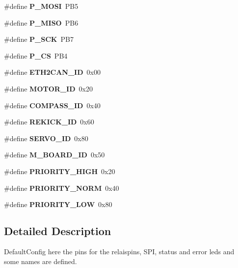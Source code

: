 \begin{DoxyCompactItemize}
\item 
\#define {\bfseries \-P\-\_\-\-M\-O\-S\-I}~\-P\-B5\label{defaults_8h_a6023494e194ef83733de87fc5b704c01}

\item 
\#define {\bfseries \-P\-\_\-\-M\-I\-S\-O}~\-P\-B6\label{defaults_8h_a8644e32e9fe3b629a67a3475191e4731}

\item 
\#define {\bfseries \-P\-\_\-\-S\-C\-K}~\-P\-B7\label{defaults_8h_adbb2b26d54c39d1abbfd329a341aeecf}

\item 
\#define {\bfseries \-P\-\_\-\-C\-S}~\-P\-B4\label{defaults_8h_ae8426304450bedff47d0d9ec95d81d54}

\item 
\#define {\bfseries \-E\-T\-H2\-C\-A\-N\-\_\-\-I\-D}~0x00\label{defaults_8h_a710ed9ce54f1442af0b677cb8e400d87}

\item 
\#define {\bfseries \-M\-O\-T\-O\-R\-\_\-\-I\-D}~0x20\label{defaults_8h_a4ff57d9a8532f5380a75ee424107f707}

\item 
\#define {\bfseries \-C\-O\-M\-P\-A\-S\-S\-\_\-\-I\-D}~0x40\label{defaults_8h_a237f2be956bf377b409ba61dd85b744c}

\item 
\#define {\bfseries \-R\-E\-K\-I\-C\-K\-\_\-\-I\-D}~0x60\label{defaults_8h_acd19df83c2759678fa8ad5986874a852}

\item 
\#define {\bfseries \-S\-E\-R\-V\-O\-\_\-\-I\-D}~0x80\label{defaults_8h_a8c6c9532e71ef136a9460a991a75a298}

\item 
\#define {\bfseries \-M\-\_\-\-B\-O\-A\-R\-D\-\_\-\-I\-D}~0x50\label{defaults_8h_a5a248e3499cfaa956028ce3fb94806c2}

\item 
\#define {\bfseries \-P\-R\-I\-O\-R\-I\-T\-Y\-\_\-\-H\-I\-G\-H}~0x20\label{defaults_8h_aaca04d3893d808496a90f8f0d0b8fcaa}

\item 
\#define {\bfseries \-P\-R\-I\-O\-R\-I\-T\-Y\-\_\-\-N\-O\-R\-M}~0x40\label{defaults_8h_af6f32916be2beaae48f7ac07be26d3f5}

\item 
\#define {\bfseries \-P\-R\-I\-O\-R\-I\-T\-Y\-\_\-\-L\-O\-W}~0x80\label{defaults_8h_af9877767f734190a66ec73e03252e1ce}

\end{DoxyCompactItemize}


\subsection{\-Detailed \-Description}
\-Default\-Config here the pins for the relaispins, \-S\-P\-I, status and error leds and some names are defined. 